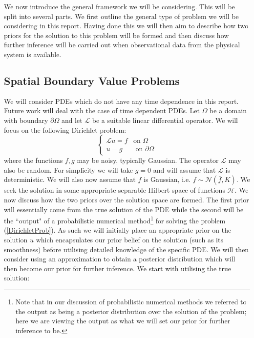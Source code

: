 \vspace{5pt}We now introduce the general framework we will be considering. This will be split into several parts. We first outline the general type of problem we will be considering in this report. Having done this we will then aim to describe how two priors for the solution to this problem will be formed and then discuss how further inference will be carried out when observational data from the physical system is available.


\subsection{Spatial Boundary Value Problems}

We will consider PDEs which do not have any time dependence in this report. Future work will deal with the case of time dependent PDEs. Let $\Omega$ be a domain with boundary $\partial\Omega$ and let $\mathcal{L}$ be a suitable linear differential operator. We will focus on the following Dirichlet problem:
\begin{equation}
\label{DirichletProb}
    \left\{
    \begin{array}{cc}
        \mathcal{L}u=f & \text{on } \Omega  \\
         u = g  & \text{ on } \partial\Omega
    \end{array}
    \right.
\end{equation}
where the functions $f,g$ may be noisy, typically Gaussian. The operator $\mathcal{L}$ may also be random. For simplicity we will take $g=0$ and will assume that $\mathcal{L}$ is deterministic. We will also now assume that $f$ is Gaussian, i.e. $f\sim\mathcal{N}(\bar{f},K)$. We seek the solution in some appropriate separable Hilbert space of functions $\mathcal{H}$. We now discuss how the two priors over the solution space are formed. The first prior will essentially come from the true solution of the PDE while the second will be the ``output" of a probabilistic numerical method\footnote{Note that in our discussion of probabilistic numerical methods we referred to the output as being a posterior distribution over the solution of the problem; here we are viewing the output as what we will set our prior for further inference to be.} for solving the problem (\ref{DirichletProb}). As such we will initially place an appropriate prior on the solution $u$ which encapsulates our prior belief on the solution (such as its smoothness) before utilising detailed knowledge of the specific PDE. We will then consider using an approximation to obtain a posterior distribution which will then become our prior for further inference. We start with utilising the true solution:


